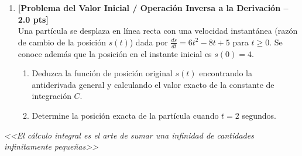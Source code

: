 \documentclass[10pt,a4paper]{article}
\begin{document}
\begin{enumerate}[leftmargin=*,itemsep=5pt,topsep=1pt,label=\textbf{\arabic*.}]
    \item \textbf{[Problema del Valor Inicial / Operación Inversa a la Derivación -- 2.0 pts]} \\
    Una partícula se desplaza en línea recta con una velocidad instantánea (razón de cambio de la posición $s(t)$) dada por $\displaystyle \frac{ds}{dt} = 6t^2 - 8t + 5$ para $t \ge 0$. Se conoce además que la posición en el instante inicial es $s(0) = 4$.
    \begin{enumerate}[label=\alph*),itemsep=1pt,topsep=1pt]
        \item Deduzca la función de posición original $s(t)$ encontrando la antiderivada general y calculando el valor exacto de la constante de integración $C$.
        \item Determine la posición exacta de la partícula cuando $t = 2$ segundos.
    \end{enumerate}

\end{enumerate}

\vspace{5pt}
\begin{center}
    \footnotesize \textit{<<El cálculo integral es el arte de sumar una infinidad de cantidades infinitamente pequeñas>>}
\end{center}
\end{document}
